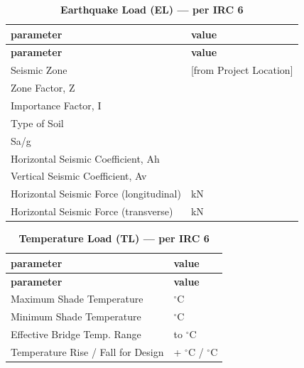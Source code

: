 \vspace{1em}
\begin{longtable}{|L{5.5cm}|p{10.0cm}|}
\caption{\textbf{Earthquake Load (EL) --- per IRC 6}}
\hline
\textbf{parameter} & \textbf{value} \\
\hline
\endfirsthead

\hline
\textbf{parameter} & \textbf{value} \\
\hline
\endhead
\textnormal{Seismic Zone} &  [from Project Location] \\[6pt]
\hline
\textnormal{Zone Factor, Z} &  \\[6pt]
\hline
\textnormal{Importance Factor, I} &  \\[6pt]
\hline
\textnormal{Type of Soil} &  \\[6pt]
\hline
\textnormal{Sa/g} &  \\[6pt]
\hline
\textnormal{Horizontal Seismic Coefficient, Ah} &  \\[6pt]
\hline
\textnormal{Vertical Seismic Coefficient, Av} &  \\[6pt]
\hline
\textnormal{Horizontal Seismic Force (longitudinal)} &  kN \\[6pt]
\hline
\textnormal{Horizontal Seismic Force (transverse)} &  kN \\[6pt]
\hline
\end{longtable}

\vspace{1em}
\begin{longtable}{|L{5.5cm}|p{10.0cm}|}
\caption{\textbf{Temperature Load (TL) --- per IRC 6}}
\hline
\textbf{parameter} & \textbf{value} \\
\hline
\endfirsthead

\hline
\textbf{parameter} & \textbf{value} \\
\hline
\endhead
\textnormal{Maximum Shade Temperature} &  $^\circ$C \\[6pt]
\hline
\textnormal{Minimum Shade Temperature} &  $^\circ$C \\[6pt]
\hline
\textnormal{Effective Bridge Temp. Range} &  to  $^\circ$C \\[6pt]
\hline
\textnormal{Temperature Rise / Fall for Design} & + $^\circ$C / \textminus{} $^\circ$C \\[6pt]
\hline
\end{longtable}


